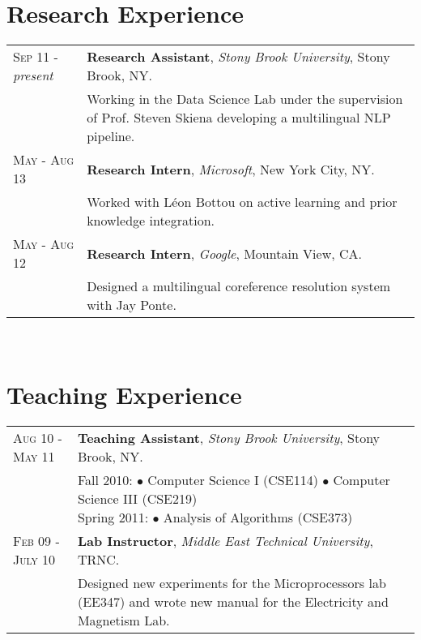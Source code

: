 \documentclass[a4paper, oneside, final]{scrartcl}
\newcommand{\twidthb}{12.65cm}
\newcommand{\twidtha}{3.0cm}
\begin{document}
\section{Research Experience}
\begin{tabular}{p{\twidtha}p{\twidthb}}
\textsc{Sep 11} - \emph{present}  & \textbf{Research Assistant}, \emph{Stony Brook University}, Stony Brook, NY. \\
                    & \footnotesize{\parbox{\twidthb}{Working in the Data
Science Lab under the supervision of Prof. Steven Skiena developing a
multilingual NLP pipeline.}}
\\\textsc{May - Aug 13}  & \textbf{Research Intern}, \emph{Microsoft}, New York City, NY. \\                    
 & \footnotesize{\parbox{\twidthb}{Worked with L\'{e}on Bottou on active learning and prior knowledge integration.}}
\\\textsc{May - Aug 12}  & \textbf{Research Intern}, \emph{Google}, Mountain View, CA. \\                    
 & \footnotesize{\parbox{\twidthb}{Designed a multilingual coreference resolution system with Jay Ponte.}}
\end{tabular}\\

\section{Teaching Experience}
\begin{tabular}{p{\twidtha}p{\twidthb}}
\textsc{Aug 10 - May 11}  & \textbf{Teaching Assistant}, \emph{Stony Brook University}, Stony Brook, NY. \\
                    & \footnotesize{\parbox{\twidthb}{
                        Fall 2010:
                        $\bullet$ Computer Science I (CSE114)
                        $\bullet$ Computer Science III (CSE219)\\
                        Spring 2011: $\bullet$ Analysis of Algorithms (CSE373)}}
\\\textsc{Feb 09 - July 10}  & \textbf{Lab Instructor}, \emph{Middle East Technical University}, TRNC. \\
                    & \footnotesize{\parbox{\twidthb}{
                     Designed new experiments for the Microprocessors lab (EE347) and wrote new manual for the Electricity and Magnetism Lab.}}
\end{tabular}\\
\end{document}
